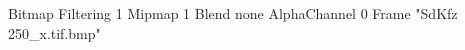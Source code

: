 {Bitmap
	{Filtering 1}
	{Mipmap 1}
	{Blend none}
	{AlphaChannel 0}
	{Frame "SdKfz 250_x.tif.bmp"}
}
